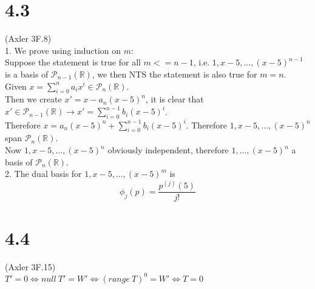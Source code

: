 \documentclass{article}
\begin{document}
\section{4.3}
(Axler 3F.8)\\
1. We prove using induction on $m$:\\
Suppose the statement is true for all $m <= n-1$, i.e. $1, x-5, ..., (x-5)^{n-1}$ is a basis of $\mathcal{P}_{n-1}(\mathbb{R})$, we then NTS the statement is also true for $m=n$.\\
Given $x = \sum_{i=0}^{n}a_ix^i \in \mathcal{P}_n(\mathbb{R})$.\\
Then we create $x' = x - a_n(x-5)^n$, it is clear that $x' \in \mathcal{P}_{n-1}(\mathbb{R}) \rightarrow x' = \sum_{i=0}^{n-1}b_i(x-5)^i$.\\
Therefore $x = a_n(x-5)^n + \sum_{i=0}^{n-1}b_i(x-5)^i$. Therefore $1, x-5, ..., (x-5)^n$ span $\mathcal{P}_n(\mathbb{R})$.\\
Now $1, x-5, ..., (x-5)^n$ obviously independent, therefore $1, ..., (x-5)^n$ a basis of $\mathcal{P}_n(\mathbb{R})$.\\
2. The dual basis for $1, x-5, ..., (x-5)^m$ is
\begin{equation*}
    \phi_j(p) = \frac{p^{(j)}(5)}{j!}
\end{equation*}
\section{4.4}
(Axler 3F.15)\\
$T' = 0 \iff null\ T' = W' \iff (range\ T)^0 = W' \iff T = 0$
\end{document}
